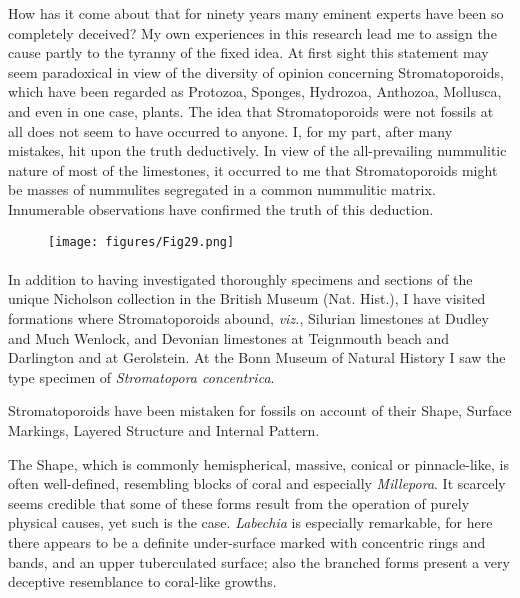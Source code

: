 \documentclass[a4paper, 12pt, oneside]{article}
\begin{document}
How has it come about that for ninety years many eminent experts have been so completely deceived? My own experiences in this research lead me to assign the cause partly to the tyranny of the fixed idea. At first sight this statement may seem paradoxical in view of the diversity of opinion concerning Stromatoporoids, which have been regarded as Protozoa, Sponges, Hydrozoa, Anthozoa, Mollusca, and even in one case, plants. The idea that Stromatoporoids were not fossils at all does not seem to have occurred to anyone. I, for my part, after many mistakes, hit upon the truth deductively. In view of the all-prevailing nummulitic nature of most of the limestones, it occurred to me that Stromatoporoids might be masses of nummulites segregated in a common nummulitic matrix. Innumerable observations have confirmed the truth of this deduction.
\begin{figure}[H]
\centering
\texttt{[image: figures/Fig29.png]}
\caption*{}
\end{figure}
\paragraph{}
In addition to having investigated thoroughly specimens and sections of the unique Nicholson collection in the British Museum (Nat. Hist.), I have visited formations where Stromatoporoids abound, \emph{viz.}, Silurian limestones at Dudley and Much Wenlock, and Devonian limestones at Teignmouth beach and Darlington and at Gerolstein. At the Bonn Museum of Natural History I saw the type specimen of \emph{Stromatopora concentrica}.

Stromatoporoids have been mistaken for fossils on account of their Shape, Surface Markings, Layered Structure and Internal Pattern.

The Shape, which is commonly hemispherical, massive, conical or pinnacle-like, is often well-defined, resembling blocks of coral and especially \emph{Millepora}. It scarcely seems credible that some of these forms result from the operation of purely physical causes, yet such is the case. \emph{Labechia} is especially remarkable, for here there appears to be a definite under-surface marked with concentric rings and bands, and an upper tuberculated surface; also the branched forms present a very deceptive resemblance to coral-like growths.
\end{document}
